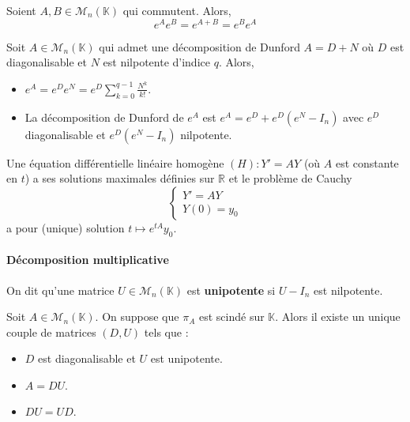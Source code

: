   \begin{proposition}
    Soient $A, B \in \mathcal{M}_n(\mathbb{K})$ qui commutent. Alors,
    \[ e^A e^B = e^{A+B} = e^B e^A \]
  \end{proposition}

  \begin{example}
    Soit $A \in \mathcal{M}_n(\mathbb{K})$ qui admet une décomposition de Dunford $A = D+N$ où $D$ est diagonalisable et $N$ est nilpotente d'indice $q$. Alors,
    \begin{itemize}
      \item $e^A = e^D e^N = e^D \sum_{k=0}^{q-1} \frac{N^k}{k!}$.
      \item La décomposition de Dunford de $e^A$ est $e^A = e^D + e^D(e^N - I_n)$ avec $e^D$ diagonalisable et $e^D(e^N - I_n)$ nilpotente.
    \end{itemize}
  \end{example}


  \begin{application}
    Une équation différentielle linéaire homogène $(H) : Y' = AY$ (où $A$ est constante en $t$) a ses solutions maximales définies sur $\mathbb{R}$ et le problème de Cauchy
    \[ \begin{cases} Y' = AY \\ Y(0) = y_0 \end{cases} \]
    a pour (unique) solution $t \mapsto e^{tA} y_0$.
  \end{application}

  \paragraph{Décomposition multiplicative}


  \begin{definition}
    On dit qu'une matrice $U \in \mathcal{M}_n(\mathbb{K})$ est \textbf{unipotente} si $U - I_n$ est nilpotente.
  \end{definition}

  \begin{theorem}
    Soit $A \in \mathcal{M}_n(\mathbb{K})$. On suppose que $\pi_A$ est scindé sur $\mathbb{K}$. Alors il existe un unique couple de matrices $(D, U)$ tels que :
    \begin{itemize}
      \item $D$ est diagonalisable et $U$ est unipotente.
      \item $A = DU$.
      \item $DU = UD$.
    \end{itemize}
  \end{theorem}

